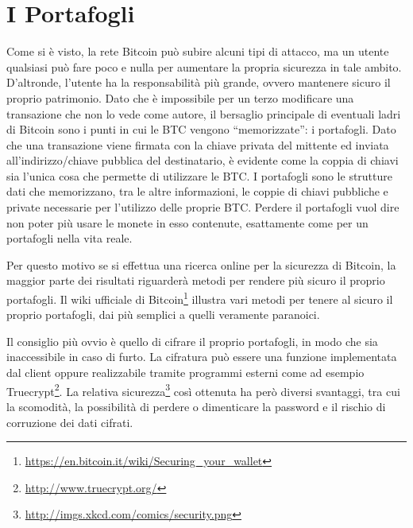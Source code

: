 \section{I Portafogli}\label{i-portafogli}

Come si è visto, la rete Bitcoin può subire alcuni tipi di attacco, ma un utente qualsiasi può fare poco e nulla per aumentare la propria sicurezza in tale ambito.
D'altronde, l'utente ha la responsabilità più grande, ovvero mantenere sicuro il proprio patrimonio. Dato che è impossibile per un terzo modificare una transazione che non lo vede come autore, il bersaglio principale di eventuali ladri di Bitcoin sono i punti in cui le BTC vengono ``memorizzate'': i portafogli.
Dato che una transazione viene firmata con la chiave privata del mittente ed inviata all'indirizzo/chiave pubblica del destinatario, è evidente come la coppia di chiavi sia l'unica cosa che permette di utilizzare le BTC.
I portafogli sono le strutture dati che memorizzano, tra le altre informazioni, le coppie di chiavi pubbliche e private necessarie per l'utilizzo delle proprie BTC. Perdere il portafogli vuol dire non poter più usare le monete in esso contenute, esattamente come per un portafogli nella vita reale.

Per questo motivo se si effettua una ricerca online per la sicurezza di Bitcoin, la maggior parte dei risultati riguarderà metodi per rendere più sicuro il proprio portafogli.
Il wiki ufficiale di Bitcoin\footnote{\url{https://en.bitcoin.it/wiki/Securing_your_wallet}} illustra vari metodi per tenere al sicuro il proprio portafogli, dai più semplici a quelli veramente paranoici.

Il consiglio più ovvio è quello di cifrare il proprio portafogli, in modo che sia inaccessibile in caso di furto. La cifratura può essere una funzione implementata dal client oppure realizzabile tramite programmi esterni come ad esempio Truecrypt\footnote{\url{http://www.truecrypt.org/}}. La relativa sicurezza\footnote{\url{http://imgs.xkcd.com/comics/security.png}} così ottenuta ha però diversi svantaggi, tra cui la scomodità, la possibilità di perdere o dimenticare la password e il rischio di corruzione dei dati cifrati.

